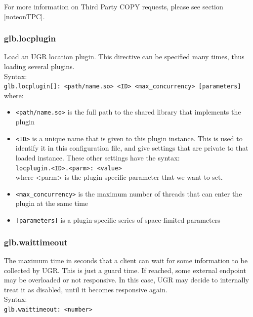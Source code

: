\documentclass[12pt]{article} %
\begin{document}
  For more information on Third Party COPY requests, please see section \ref{noteonTPC}.\\
  


\subsubsection{\label{glb.locplugin}glb.locplugin}

 Load an UGR location plugin. This directive can be specified many times, thus loading several plugins.\\
 
 Syntax:\\

\lstinline"glb.locplugin[]: <path/name.so> <ID> <max_concurrency> [parameters]"\\

where:

\begin{itemize}
\item \lstinline"<path/name.so>" is the full path to the shared library that implements the plugin
\item \lstinline"<ID>" is a unique name that is given to this plugin instance. This is used to identify it in this configuration file, and give settings that are private to that loaded instance. These other settings have the syntax:\\
      \lstinline"locplugin.<ID>.<parm>: <value>"\\
     where <parm> is the plugin-specific parameter that we want to set.
\item \lstinline"<max_concurrency>" is the maximum number of threads that can enter the plugin at the same time
\item \lstinline"[parameters]" is a plugin-specific series of space-limited parameters
\end{itemize}


\subsubsection{glb.waittimeout}

The maximum time in seconds that a client can wait for some information to be collected by UGR. This is just a guard time. If reached, some external endpoint may be overloaded or not responsive. In this case, UGR may decide to internally treat it as disabled, until it becomes responsive again.
\\
Syntax:\\
\lstinline"glb.waittimeout: <number>"
\end{document}
